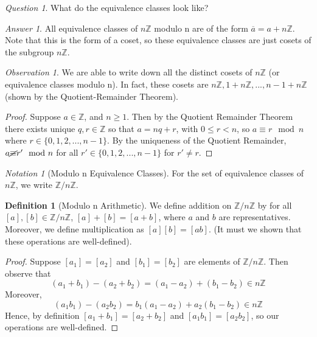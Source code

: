 \documentclass[12pt]{article}
\theoremstyle{definition}
\newtheorem{defn}[thm]{Definition}
\theoremstyle{remark}
\newtheorem*{qst}{Question}
\newtheorem*{ans}{Answer}
\newtheorem{obs}[thm]{Observation}
\newtheorem{nota}[thm]{Notation}
\numberwithin{equation}{section}
\newcommand\Z{\mathbb Z}    %
\begin{document}
\begin{qst}
        What do the equivalence classes look like?
\end{qst}
\begin{ans}
        All equivalence classes of $n\Z$ modulo n are of the form $\overline{a} = a + n\Z$. Note that this is the form of a coset, so these equivalence classes are just cosets of the subgroup $n\Z$.
\end{ans}

\vspace{15pt}

\begin{obs}
        We are able to write down all the distinct cosets of $n\Z$ (or equivalence classes modulo n). In fact, these cosets are $n\Z, 1+n\Z,...,n-1+n\Z$ (shown by the Quotient-Remainder Theorem).
\end{obs}
\begin{proof}
        Suppose $a \in \Z$, and $n \geq 1$. Then by the Quotient Remainder Theorem there exists unique $q,r \in \Z$ so that $a = nq + r$, with $0 \leq r < n$, so $a \equiv r \mod n$ where $r \in \{0,1,2,...,n-1\}$. By the uniqueness of the Quotient Remainder, $a \cancel{\equiv} r' \mod n$ for all $r' \in \{0,1,2,...,n-1\}$ for $r' \neq r$.
\end{proof}

\vspace{15pt}


\begin{nota}[Modulo n Equivalence Classes]
        For the set of equivalence classes of $n\Z$, we write $\Z/n\Z$.
\end{nota}


\vspace{15pt}

\begin{defn}[Modulo n Arithmetic]
        We define addition on $\Z/n\Z$ by for all $[a],[b] \in \Z/n\Z$, $[a]+[b] = [a+b]$, where $a$ and $b$ are representatives. Moreover, we define multiplication as $[a][b] = [ab]$. (It must we shown that these operations are well-defined).
\end{defn}

\begin{proof}
        Suppose $[a_1]=[a_2]$ and $[b_1]=[b_2]$ are elements of $\Z/n\Z$. Then observe that $$(a_1+b_1)-(a_2+b_2) = (a_1 - a_2) + (b_1 - b_2) \in n\Z$$ Moreover, $$(a_1b_1) - (a_2b_2) = b_1(a_1-a_2) + a_2(b_1-b_2) \in n\Z$$ Hence, by definition $[a_1+b_1] = [a_2+b_2]$ and $[a_1b_1]=[a_2b_2]$, so our operations are well-defined.
\end{proof}
\end{document}
